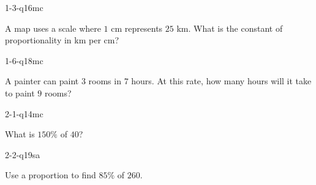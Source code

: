 
\begin{practiceQuestion}{1-3-q16}{mc}
\begin{questionText}
A map uses a scale where $1$ cm represents $25$ km. What is the constant of proportionality in km per cm?
\end{questionText}
\end{practiceQuestion}

\begin{practiceQuestion}{1-6-q18}{mc}
\begin{questionText}
A painter can paint $3$ rooms in $7$ hours. At this rate, how many hours will it take to paint $9$ rooms?
\end{questionText}
\end{practiceQuestion}

\begin{practiceQuestion}{2-1-q14}{mc}
\begin{questionText}
What is $150\%$ of $40$?
\end{questionText}
\end{practiceQuestion}

\begin{practiceQuestion}{2-2-q19}{sa}
\begin{questionText}
Use a proportion to find $85\%$ of $260$.
\end{questionText}
\end{practiceQuestion}

